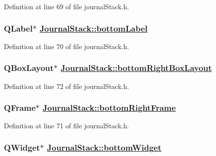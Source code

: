Definition at line 69 of file journal\-Stack.h.\hypertarget{classJournalStack_r17}{
\subsubsection[bottomLabel]{\setlength{\rightskip}{0pt plus 5cm}QLabel$\ast$ \hyperlink{classJournalStack_r17}{Journal\-Stack::bottom\-Label}}}
\label{classJournalStack_r17}


Definition at line 70 of file journal\-Stack.h.\hypertarget{classJournalStack_r19}{
\subsubsection[bottomRightBoxLayout]{\setlength{\rightskip}{0pt plus 5cm}QBox\-Layout$\ast$ \hyperlink{classJournalStack_r19}{Journal\-Stack::bottom\-Right\-Box\-Layout}}}
\label{classJournalStack_r19}


Definition at line 72 of file journal\-Stack.h.\hypertarget{classJournalStack_r18}{
\subsubsection[bottomRightFrame]{\setlength{\rightskip}{0pt plus 5cm}QFrame$\ast$ \hyperlink{classJournalStack_r18}{Journal\-Stack::bottom\-Right\-Frame}}}
\label{classJournalStack_r18}


Definition at line 71 of file journal\-Stack.h.\hypertarget{classJournalStack_r15}{
\subsubsection[bottomWidget]{\setlength{\rightskip}{0pt plus 5cm}QWidget$\ast$ \hyperlink{classJournalStack_r15}{Journal\-Stack::bottom\-Widget}}}
\label{classJournalStack_r15}


